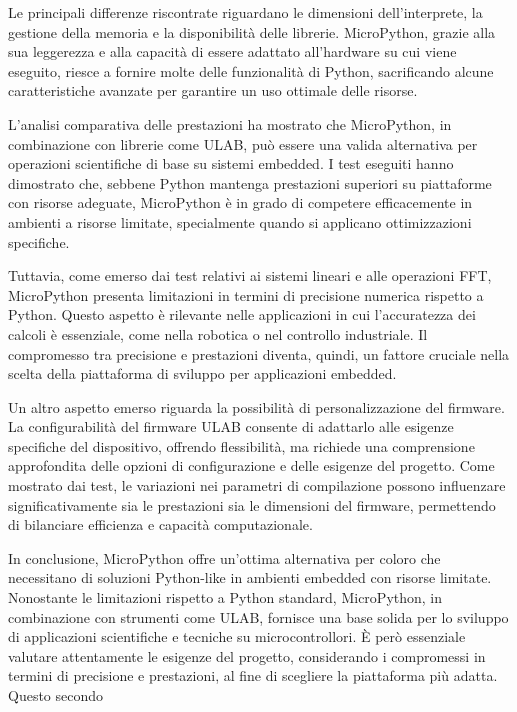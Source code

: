 \documentclass[12pt,a4paper]{report}
\begin{document}
Le principali differenze riscontrate riguardano le dimensioni dell'interprete, la gestione della memoria e la disponibilità delle librerie. MicroPython, grazie alla sua leggerezza e alla capacità di essere adattato all'hardware su cui viene eseguito, riesce a fornire molte delle funzionalità di Python, sacrificando alcune caratteristiche avanzate per garantire un uso ottimale delle risorse.

L'analisi comparativa delle prestazioni ha mostrato che MicroPython, in combinazione con librerie come ULAB, può essere una valida alternativa per operazioni scientifiche di base su sistemi embedded. I test eseguiti hanno dimostrato che, sebbene Python mantenga prestazioni superiori su piattaforme con risorse adeguate, MicroPython è in grado di competere efficacemente in ambienti a risorse limitate, specialmente quando si applicano ottimizzazioni specifiche.

Tuttavia, come emerso dai test relativi ai sistemi lineari e alle operazioni FFT, MicroPython presenta limitazioni in termini di precisione numerica rispetto a Python. Questo aspetto è rilevante nelle applicazioni in cui l'accuratezza dei calcoli è essenziale, come nella robotica o nel controllo industriale. Il compromesso tra precisione e prestazioni diventa, quindi, un fattore cruciale nella scelta della piattaforma di sviluppo per applicazioni embedded.

Un altro aspetto emerso riguarda la possibilità di personalizzazione del firmware. La configurabilità del firmware ULAB consente di adattarlo alle esigenze specifiche del dispositivo, offrendo flessibilità, ma richiede una comprensione approfondita delle opzioni di configurazione e delle esigenze del progetto. Come mostrato dai test, le variazioni nei parametri di compilazione possono influenzare significativamente sia le prestazioni sia le dimensioni del firmware, permettendo di bilanciare efficienza e capacità computazionale.

In conclusione, MicroPython offre un'ottima alternativa per coloro che necessitano di soluzioni Python-like in ambienti embedded con risorse limitate. Nonostante le limitazioni rispetto a Python standard, MicroPython, in combinazione con strumenti come ULAB, fornisce una base solida per lo sviluppo di applicazioni scientifiche e tecniche su microcontrollori. È però essenziale valutare attentamente le esigenze del progetto, considerando i compromessi in termini di precisione e prestazioni, al fine di scegliere la piattaforma più adatta. Questo secondo \cite{CUDAtutorial}



\end{document}
